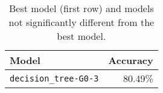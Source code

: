 \begin{table}[H]
    \centering
    \begin{tabular}{|l|r|}
        \hline
        \textbf{Model} & \textbf{Accuracy} \\
        \hline
        \texttt{decision\_tree-G0-3} & 80.49\% \\
        \hline
    \end{tabular}
    \caption{Best model (first row) and models not significantly different from the best model.}
    \label{tab:best_models}
\end{table}
